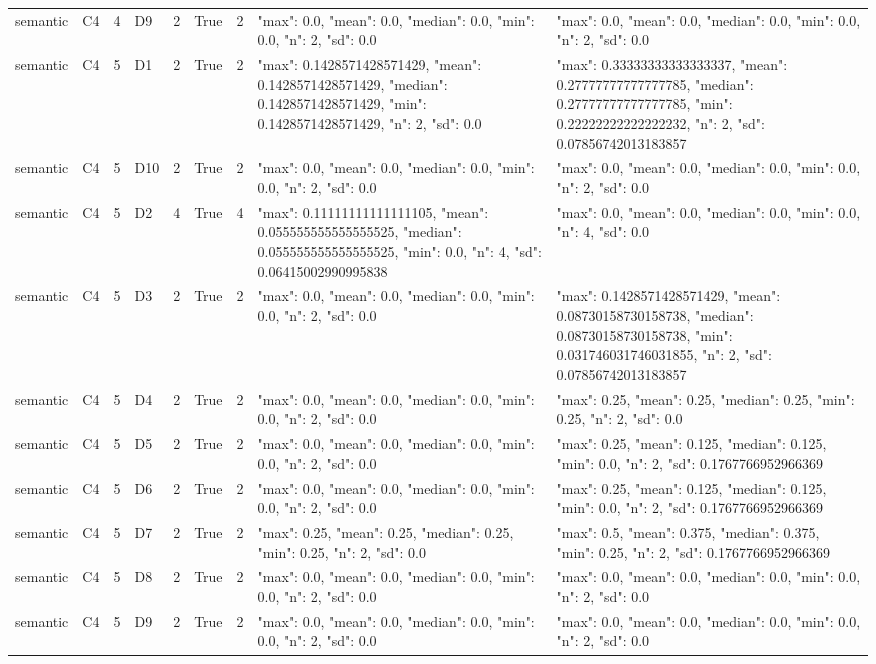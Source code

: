 \begin{tabular}{lllllllll}
semantic & C4 & 4 & D9 & 2 & True & 2 & {"max": 0.0, "mean": 0.0, "median": 0.0, "min": 0.0, "n": 2, "sd": 0.0} & {"max": 0.0, "mean": 0.0, "median": 0.0, "min": 0.0, "n": 2, "sd": 0.0} \\
semantic & C4 & 5 & D1 & 2 & True & 2 & {"max": 0.1428571428571429, "mean": 0.1428571428571429, "median": 0.1428571428571429, "min": 0.1428571428571429, "n": 2, "sd": 0.0} & {"max": 0.33333333333333337, "mean": 0.27777777777777785, "median": 0.27777777777777785, "min": 0.22222222222222232, "n": 2, "sd": 0.07856742013183857} \\
semantic & C4 & 5 & D10 & 2 & True & 2 & {"max": 0.0, "mean": 0.0, "median": 0.0, "min": 0.0, "n": 2, "sd": 0.0} & {"max": 0.0, "mean": 0.0, "median": 0.0, "min": 0.0, "n": 2, "sd": 0.0} \\
semantic & C4 & 5 & D2 & 4 & True & 4 & {"max": 0.11111111111111105, "mean": 0.055555555555555525, "median": 0.055555555555555525, "min": 0.0, "n": 4, "sd": 0.06415002990995838} & {"max": 0.0, "mean": 0.0, "median": 0.0, "min": 0.0, "n": 4, "sd": 0.0} \\
semantic & C4 & 5 & D3 & 2 & True & 2 & {"max": 0.0, "mean": 0.0, "median": 0.0, "min": 0.0, "n": 2, "sd": 0.0} & {"max": 0.1428571428571429, "mean": 0.08730158730158738, "median": 0.08730158730158738, "min": 0.031746031746031855, "n": 2, "sd": 0.07856742013183857} \\
semantic & C4 & 5 & D4 & 2 & True & 2 & {"max": 0.0, "mean": 0.0, "median": 0.0, "min": 0.0, "n": 2, "sd": 0.0} & {"max": 0.25, "mean": 0.25, "median": 0.25, "min": 0.25, "n": 2, "sd": 0.0} \\
semantic & C4 & 5 & D5 & 2 & True & 2 & {"max": 0.0, "mean": 0.0, "median": 0.0, "min": 0.0, "n": 2, "sd": 0.0} & {"max": 0.25, "mean": 0.125, "median": 0.125, "min": 0.0, "n": 2, "sd": 0.1767766952966369} \\
semantic & C4 & 5 & D6 & 2 & True & 2 & {"max": 0.0, "mean": 0.0, "median": 0.0, "min": 0.0, "n": 2, "sd": 0.0} & {"max": 0.25, "mean": 0.125, "median": 0.125, "min": 0.0, "n": 2, "sd": 0.1767766952966369} \\
semantic & C4 & 5 & D7 & 2 & True & 2 & {"max": 0.25, "mean": 0.25, "median": 0.25, "min": 0.25, "n": 2, "sd": 0.0} & {"max": 0.5, "mean": 0.375, "median": 0.375, "min": 0.25, "n": 2, "sd": 0.1767766952966369} \\
semantic & C4 & 5 & D8 & 2 & True & 2 & {"max": 0.0, "mean": 0.0, "median": 0.0, "min": 0.0, "n": 2, "sd": 0.0} & {"max": 0.0, "mean": 0.0, "median": 0.0, "min": 0.0, "n": 2, "sd": 0.0} \\
semantic & C4 & 5 & D9 & 2 & True & 2 & {"max": 0.0, "mean": 0.0, "median": 0.0, "min": 0.0, "n": 2, "sd": 0.0} & {"max": 0.0, "mean": 0.0, "median": 0.0, "min": 0.0, "n": 2, "sd": 0.0} \\
\end{tabular}